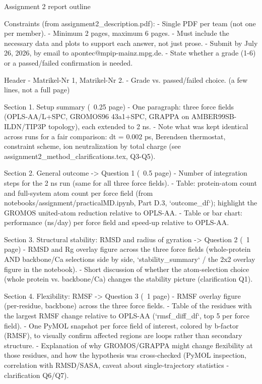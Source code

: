 Assignment 2 report outline

Constraints (from assignment2_description.pdf):
- Single PDF per team (not one per member).
- Minimum 2 pages, maximum 6 pages.
- Must include the necessary data and plots to support each answer, not just prose.
- Submit by July 26, 2026, by email to apontec@mpip-mainz.mpg.de.
- State whether a grade (1-6) or a passed/failed confirmation is needed.

Header
- Matrikel-Nr 1, Matrikel-Nr 2.
- Grade vs. passed/failed choice.
(a few lines, not a full page)

Section 1. Setup summary (~0.25 page)
- One paragraph: three force fields (OPLS-AA/L+SPC, GROMOS96 43a1+SPC, GRAPPA on
  AMBER99SB-ILDN/TIP3P topology), each extended to 2 ns.
- Note what was kept identical across runs for a fair comparison: dt = 0.002 ps, Berendsen
  thermostat, constraint scheme, ion neutralization by total charge (see
  assignment2_method_clarifications.tex, Q3-Q5).

Section 2. General outcome -> Question 1 (~0.5 page)
- Number of integration steps for the 2 ns run (same for all three force fields).
- Table: protein-atom count and full-system atom count per force field (from
  notebooks/assignment/practicalMD.ipynb, Part D.3, `outcome_df`); highlight the GROMOS
  united-atom reduction relative to OPLS-AA.
- Table or bar chart: performance (ns/day) per force field and speed-up relative to OPLS-AA.

Section 3. Structural stability: RMSD and radius of gyration -> Question 2 (~1 page)
- RMSD and Rg overlay figure across the three force fields (whole-protein AND backbone/Ca
  selections side by side, `stability_summary` / the 2x2 overlay figure in the notebook).
- Short discussion of whether the atom-selection choice (whole protein vs. backbone/Ca)
  changes the stability picture (clarification Q1).

Section 4. Flexibility: RMSF -> Question 3 (~1 page)
- RMSF overlay figure (per-residue, backbone) across the three force fields.
- Table of the residues with the largest RMSF change relative to OPLS-AA
  (`rmsf_diff_df`, top 5 per force field).
- One PyMOL snapshot per force field of interest, colored by b-factor (RMSF), to visually
  confirm affected regions are loops rather than secondary structure.
- Explanation of why GROMOS/GRAPPA might change flexibility at those residues, and how the
  hypothesis was cross-checked (PyMOL inspection, correlation with RMSD/SASA, caveat about
  single-trajectory statistics - clarification Q6/Q7).

